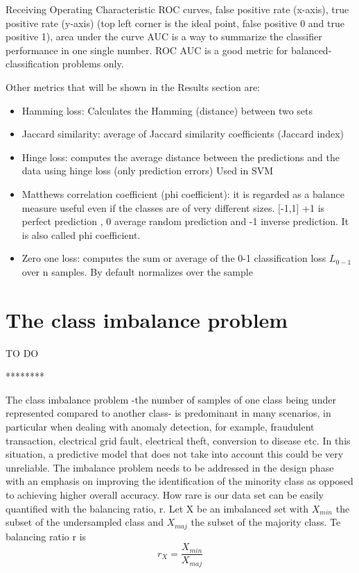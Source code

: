 \documentclass[11pt]{article}
\theoremstyle{definition}
\theoremstyle{remark}
\begin{document}
{Receiving Operating Characteristic ROC curves, false positive rate (x-axis), true positive rate (y-axis) (top left corner is the ideal point, false positive 0 and true positive 1), area under the curve AUC is a way to summarize the classifier performance in one single number. ROC AUC is a good metric for balanced-classification problems only.

Other metrics that will be shown in the Results section are:
\begin{itemize}
	\item Hamming loss: Calculates the Hamming (distance) between two sets
	\item Jaccard similarity: average of Jaccard similarity coefficients (Jaccard index)
	\item Hinge loss: computes the average distance between the predictions and the data using hinge loss (only prediction errors) Used in SVM
	\item Matthews correlation coefficient (phi coefficient): it is regarded as a balance measure useful even if the classes are of very different sizes. [-1,1] +1 is perfect prediction , 0 average random prediction and -1 inverse prediction. It is also called phi coefficient.
	\item Zero one loss: computes the sum or average of the 0-1 classification loss $L_{0-1}$ over n samples. By default normalizes over the sample
\end{itemize}



\section{The class imbalance problem}
\label{se:imbalance}
TO DO 

********

The class imbalance problem -the number of samples of one class being under represented compared to another class- is predominant in many scenarios, in particular when dealing with anomaly detection, for example, fraudulent transaction, electrical grid fault, electrical theft, conversion to disease  etc. In this situation, a predictive model that does not take into account this could be very unreliable.
The imbalance problem needs to be addressed in the design phase with an emphasis on improving the identification of the minority class as opposed to achieving higher overall accuracy.
How rare is our data set can be easily quantified with the balancing ratio, r. Let X be an imbalanced set with $X_{min}$ the subset of the undersampled class and $X_{maj}$ the subset of the majority class. Te balancing ratio r is
\begin{equation}
r_X = \frac{X_{min}}{X_{maj}}
\end{equation}

}
\end{document}

